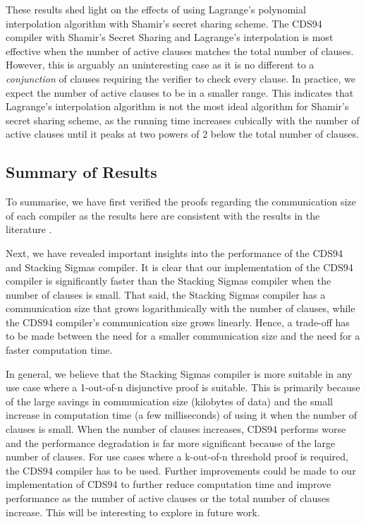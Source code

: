 These results shed light on the effects of using Lagrange's polynomial interpolation algorithm 
with Shamir's secret sharing scheme. The CDS94 compiler \cite{CDS94} with Shamir's Secret Sharing 
and Lagrange's interpolation is most effective when the number of active clauses matches the 
total number of clauses. However, this is arguably an uninteresting case as it is no different to 
a \textit{conjunction} of clauses requiring the verifier to check every clause. In practice, we 
expect the number of active clauses to be in a smaller range. This indicates that Lagrange's 
interpolation algorithm is not the most ideal algorithm for Shamir's secret sharing scheme, 
as the running time increases cubically with the number of active clauses until it peaks 
at two powers of 2 below the total number of clauses.

\subsection{Summary of Results}
To summarise, we have first verified the proofs regarding the communication size of each 
compiler as the results here are consistent with the results in the literature 
\cite{CDS94,StackingSigmas}. 

Next, we have revealed important insights into the performance 
of the CDS94 and Stacking Sigmas compiler. It is clear that our implementation of the 
CDS94 compiler is significantly faster than the Stacking Sigmas compiler when the number of 
clauses is small. That said, the Stacking Sigmas compiler has a communication size that 
grows logarithmically with the number of clauses, while the CDS94 compiler's communication
size grows linearly. Hence, a trade-off has to be made between the need for a smaller 
communication size and the need for a faster computation time. 

In general, we believe that 
the Stacking Sigmas compiler is more suitable in any use case where a 1-out-of-n disjunctive proof is suitable. This is primarily because of the large savings 
in communication size (kilobytes of data) and the small increase in computation time 
(a few milliseconds) of using it when the number of clauses is small. When the number of 
clauses increases, CDS94 performs worse and the performance degradation is far more significant 
because of the large number of clauses. For use cases where a k-out-of-n threshold proof is 
required, the CDS94 compiler has to be used. Further improvements could be made to 
our implementation of CDS94 to further reduce computation time and improve performance 
as the number of active clauses or the total number of clauses increase. This will be interesting 
to explore in future work. 

